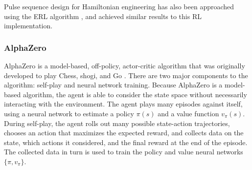 Pulse sequence design for Hamiltonian engineering has also been approached using the ERL algorithm \cite{peng2021deep}, and achieved similar results to this RL implementation.

\subsubsection{AlphaZero}

AlphaZero is a model-based, off-policy, actor-critic algorithm that was originally developed to play Chess, shogi, and Go \cite{Silver1140}. There are two major components to the algorithm: self-play and neural network training. Because AlphaZero is a model-based algorithm, the agent is able to consider the state space without necessarily interacting with the environment. The agent plays many episodes against itself, using a neural network to estimate a policy $\pi(s)$ and a value function $v_\pi(s)$. During self-play, the agent rolls out many possible state-action trajectories, chooses an action that maximizes the expected reward, and collects data on the state, which actions it considered, and the final reward at the end of the episode. The collected data in turn is used to train the policy and value neural networks $\{ \pi, v_\pi \}$.
